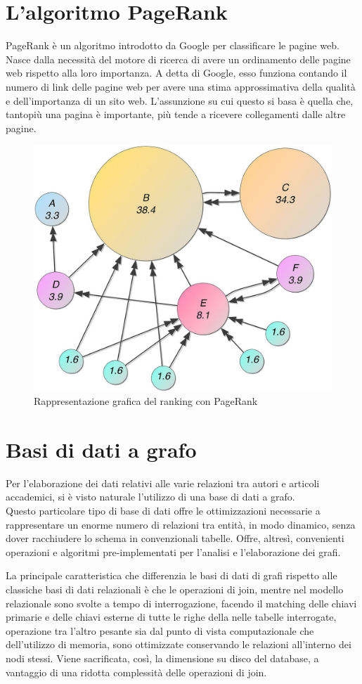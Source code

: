 \documentclass[a4paper,12pt]{article}
\begin{document}
\section*{L'algoritmo PageRank}
PageRank è un algoritmo introdotto da Google per classificare le pagine web. 
Nasce dalla necessità del motore di ricerca di avere un ordinamento delle 
pagine web rispetto alla loro importanza. A detta di Google, esso funziona 
contando il numero di link delle pagine web per avere una stima approssimativa 
della qualità e dell'importanza di un sito web. L'assunzione su cui questo si 
basa è quella che, tantopiù una pagina è importante, più tende a ricevere 
collegamenti dalle altre pagine.
\begin{figure}[h!]
  \includegraphics[width=\linewidth]{images/pagerank.jpg}
  \caption{Rappresentazione grafica del ranking con PageRank}
\end{figure}

\section*{Basi di dati a grafo}
Per l'elaborazione dei dati relativi alle varie relazioni tra autori e articoli 
accademici, si è visto naturale l'utilizzo di una base di dati a grafo. \\
Questo particolare tipo di base di dati offre le ottimizzazioni necessarie a 
rappresentare un enorme numero di relazioni tra entità, in modo dinamico, 
senza dover racchiudere lo schema in convenzionali tabelle. Offre, altresì, 
convenienti operazioni e algoritmi pre-implementati per l'analisi e 
l'elaborazione dei grafi.
\par
La principale caratteristica che differenzia le basi di dati di grafi rispetto 
alle classiche basi di dati relazionali è che le operazioni di join, mentre 
nel modello relazionale sono svolte a tempo di interrogazione, facendo il 
matching delle chiavi primarie e delle chiavi esterne di tutte le righe della 
nelle tabelle interrogate, operazione tra l'altro pesante sia dal punto di 
vista computazionale che dell'utilizzo di memoria, sono ottimizzate conservando 
le relazioni all'interno dei nodi stessi. Viene sacrificata, così, la 
dimensione su disco del database, a vantaggio di una ridotta complessità delle 
operazioni di join.
\end{document}
